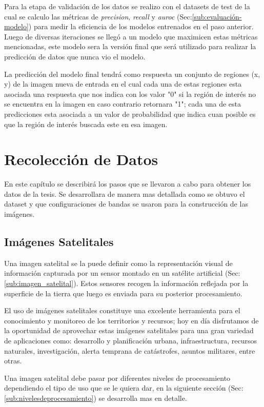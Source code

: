 Para la etapa de validación de los datos se realizo con el datasets de test de la cual se calculo las métricas de \textit{precision}, \textit{recall} y \textit{auroc} (Sec:\ref{sub:evaluación-modelo}) para medir la eficiencia de los  modelos entrenados en el paso anterior. Luego de diversas iteraciones se llegó a un modelo que maximicen estas métricas mencionadas, este modelo sera la versión final que será utilizado para realizar la predicción de datos que nunca vio el modelo.

La predicción del modelo final tendrá como respuesta un conjunto de regiones (x, y) de la imagen nueva de entrada en el cual cada una de estas regiones esta asociada una respuesta que nos indica con los valor "0" si la región de interés no se encuentra en la imagen en caso contrario  retornara "1"; cada una de esta predicciones esta asociada a un valor de probabilidad que indica cuan posible es que la región de interés buscada este en esa imagen.

\section{Recolección de Datos}\label{sec:recoleccion}

En este capítulo se describirá  los pasos que se llevaron a cabo para obtener los datos de la tesis. Se  desarrollara de manera mas detallada como se obtuvo el dataset y que configuraciones de bandas se usaron para la construcción de las imágenes.


\subsection{Imágenes Satelitales}

Una imagen satelital se la puede definir como la representación visual de información capturada por un sensor montado en un satélite artificial (Sec:\ref{sub:imagen_satelital}). Estos sensores recogen la información reflejada por la superficie de la tierra que luego es enviada para su posterior procesamiento.

El uso de imágenes satelitales constituye una excelente herramienta para el conocimiento y monitoreo de los territorios y recursos; hoy en día disfrutamos de la oportunidad de aprovechar estas imágenes satelitales para una gran variedad de aplicaciones como: desarrollo y planificación urbana, infraestructura, recursos naturales, investigación, alerta temprana de catástrofes, asuntos militares, entre otras.

Una imagen satelital debe pasar por diferentes niveles de procesamiento dependiendo el tipo de uso que se le quiera dar, en la siguiente sección (Sec:\ref{sub:nivelesdeprocesamiento}) se desarrolla mas en detalle.

